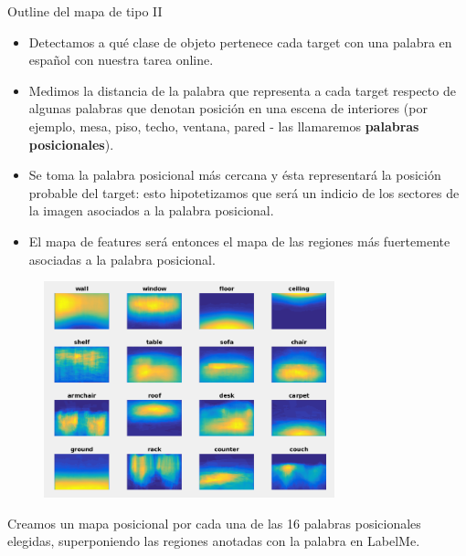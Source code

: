 \documentclass[compress]{beamer}
\begin{document}
\begin{frame}{Outline del mapa de tipo II}
\begin{itemize}
\item Detectamos a qué clase de objeto pertenece cada target con una palabra en español con nuestra tarea online.
\item Medimos la distancia de la palabra que representa a cada target respecto de algunas palabras que denotan posición en una escena de interiores (por ejemplo, mesa, piso, techo, ventana, pared
- las llamaremos \textbf{palabras posicionales}). 
\item Se toma la palabra posicional más cercana y ésta representará la posición probable del target: esto hipotetizamos que será un indicio de los sectores de la imagen asociados a la palabra posicional. 
\item El mapa de features será entonces el mapa de las regiones más fuertemente asociadas a la palabra posicional.
\end{itemize}
\end{frame}

\begin{frame}
\begin{figure}
\begin{center}
\includegraphics[width=0.75\textwidth]{images/labelme-global-features-without-horizon.png} 
\end{center}
\end{figure}

{\small Creamos un mapa posicional por cada una de las 16 palabras posicionales elegidas, superponiendo las regiones anotadas con la palabra en LabelMe.}
\end{frame}

\end{document}

